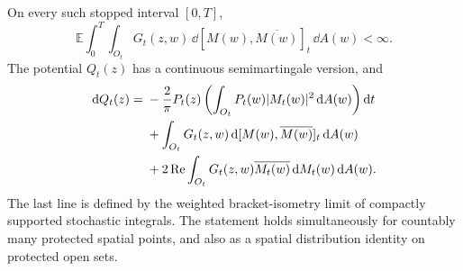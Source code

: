 \begin{lemma}
\label{cal:stochastic-potential}
On every such stopped interval $[0,T]$,
\begin{equation}
 \mathbb E\int_0^T\int_{O_t}G_t(z,w)
                         \,\dd[M(w),\overline{M(w)}]_t\,\dd A(w)<\infty.
 \label{cal:weighted-bracket}
\end{equation}
The potential $Q_t(z)$ has a continuous semimartingale version, and
\begin{align}
 \mathrm d Q_t(z)={}&-\frac2\pi P_t(z)
       \left(\int_{O_t}P_t(w)|M_t(w)|^2\,\mathrm d A(w)\right)\mathrm d t
 \notag\\
 &+\int_{O_t}G_t(z,w)\,\mathrm d[M(w),\overline{M(w)}]_t\,\mathrm d A(w)
 \notag\\
 &+2\operatorname{Re}\int_{O_t}
                G_t(z,w)\overline{M_t(w)}\,\mathrm d M_t(w)\,\mathrm d A(w).
 \label{cal:potential-differential}
\end{align}
The last line is defined by the weighted bracket-isometry limit of
compactly supported stochastic integrals.  The statement holds
simultaneously for countably many protected spatial points, and also
as a spatial distribution identity on protected open sets.
\end{lemma}

